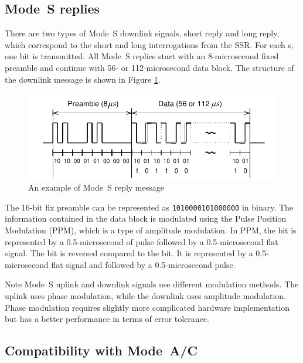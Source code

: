 \subsection{Mode~S replies}
There are two types of Mode~S downlink signals, short reply and long reply, which correspond to the short and long interrogations from the SSR. For each {\textmu}s, one bit is transmitted. All Mode~S replies start with an 8-microsecond fixed preamble and continue with 56- or 112-microsecond data block. The structure of the downlink message is shown in Figure \ref{fig:mode_s_downlink_pulses}.

\begin{figure}[ht]
  \includegraphics[scale=0.8]{figures/intro/mode_s_downlink_pulses.pdf}
  \caption{An example of Mode~S reply message}
  \label{fig:mode_s_downlink_pulses}
\end{figure}

The 16-bit fix preamble can be represented as \texttt{1010000101000000} in binary. The information contained in the data block is modulated using the Pulse Position Modulation (PPM), which is a type of amplitude modulation. In PPM, the \1 bit is represented by a 0.5-microsecond of pulse followed by a 0.5-microsecond flat signal. The \0 bit is reversed compared to the \1 bit. It is represented by a 0.5-microsecond flat signal and followed by a 0.5-microsecond pulse.

\begin{notebox}{Note}
  Mode~S uplink and downlink signals use different modulation methods. The uplink uses phase modulation, while the downlink uses amplitude modulation. Phase modulation requires slightly more complicated hardware implementation but has a better performance in terms of error tolerance. 
\end{notebox}

\subsection{Compatibility with Mode~A/C}

